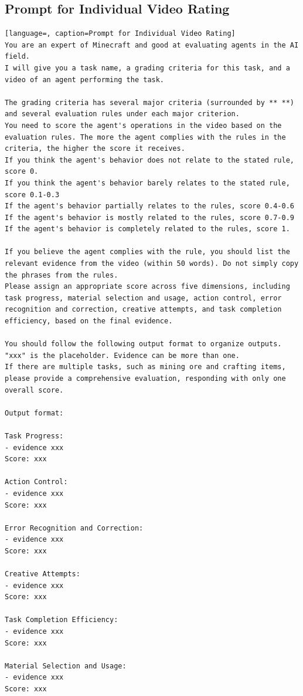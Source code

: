 \subsection{Prompt for Individual Video Rating}
\label{app:prompt_single_rating}
\begin{lstlisting}[language=, caption=Prompt for Individual Video Rating]
You are an expert of Minecraft and good at evaluating agents in the AI field.  
I will give you a task name, a grading criteria for this task, and a video of an agent performing the task.

The grading criteria has several major criteria (surrounded by ** **) and several evaluation rules under each major criterion.  
You need to score the agent's operations in the video based on the evaluation rules. The more the agent complies with the rules in the criteria, the higher the score it receives.  
If you think the agent's behavior does not relate to the stated rule, score 0.  
If you think the agent's behavior barely relates to the stated rule, score 0.1-0.3 
If the agent's behavior partially relates to the rules, score 0.4-0.6
If the agent's behavior is mostly related to the rules, score 0.7-0.9
If the agent's behavior is completely related to the rules, score 1.

If you believe the agent complies with the rule, you should list the relevant evidence from the video (within 50 words). Do not simply copy the phrases from the rules.  
Please assign an appropriate score across five dimensions, including task progress, material selection and usage, action control, error recognition and correction, creative attempts, and task completion efficiency, based on the final evidence.

You should follow the following output format to organize outputs. "xxx" is the placeholder. Evidence can be more than one.  
If there are multiple tasks, such as mining ore and crafting items, please provide a comprehensive evaluation, responding with only one overall score.

Output format:

Task Progress:
- evidence xxx
Score: xxx

Action Control:
- evidence xxx
Score: xxx

Error Recognition and Correction:
- evidence xxx
Score: xxx

Creative Attempts:
- evidence xxx
Score: xxx

Task Completion Efficiency:
- evidence xxx
Score: xxx

Material Selection and Usage:
- evidence xxx
Score: xxx


\end{lstlisting}
